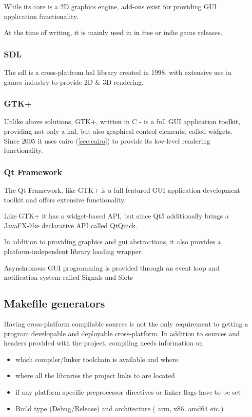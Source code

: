 While its core is a 2D graphics engine, add-ons exist for providing GUI application functionality.  

At the time of writing, it is mainly used in in free or indie game releases.

\subsubsection{SDL}
The \gls{sdl} is a cross-platfrom \gls{hal} library created in 1998, with extensive use in games industry to provide 2D \& 3D rendering.

\subsubsection{GTK+}
Unlike above solutions, GTK+, written in C - is a full GUI application toolkit, providing not only a \gls{hal}, but also graphical control elements, called widgets. Since 2005 it uses cairo (\ref{sec:cairo}) to provide its low-level rendering functionality.

\subsubsection{Qt Framework}
The Qt Framework, like GTK+ is a full-featured GUI application development toolkit and offers extensive functionality.

Like GTK+ it has a widget-based API, but since Qt5 additionally brings a JavaFX-like declarative API called QtQuick.

In addition to providing graphics and \gls{gui} abstractions, it also provides a platform-independent library loading wrapper.

Asynchronous GUI programming is provided through an event loop and notification system called Signals and Slots

\subsection{Makefile generators}
\label{sec:resMakefileGen}
Having cross-platform compilable sources is not the only requirement to getting a program developable and deployable cross-platform.
In addition to sources and headers provided with the project, compiling needs information on 
\begin{itemize}
	\item which compiler/linker toolchain is available and where
	\item where all the libraries the project links to are located
	\item if any platform specific preprocessor directives or linker flags have to be set
	\item Build type (Debug/Release) and architecture ( arm, x86, amd64 etc.)
\end{itemize}

